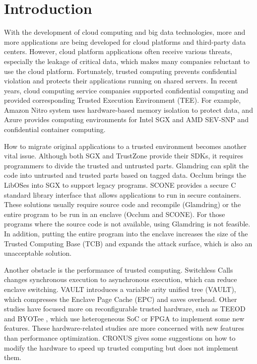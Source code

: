 \section{Introduction}
With the development of cloud computing and big data technologies,
more and more applications are being developed for cloud platforms
and third-party data centers. However, cloud platform applications
often receive various threats, especially the leakage of critical data,
which makes many companies reluctant to use the cloud platform.
Fortunately, trusted computing prevents confidential violation and
protects their applications running on shared servers.
In recent years, cloud computing service companies supported confidential
computing and provided corresponding Trusted Execution Environment (TEE).
For example, Amazon Nitro system \cite{AmazonNitro} uses hardware-based memory
isolation to protect data, and Azure \cite{AzureDocs} provides computing environments
for Intel SGX and AMD SEV-SNP and confidential container computing.

How to migrate original applications to a trusted environment becomes another
vital issue. Although both SGX and TrustZone provide their SDKs,
it requires programmers to divide the trusted and untrusted parts.
Glamdring \cite{Lind2017GlamdringAA} can split the code into untrusted and
trusted parts based on tagged data. Occlum \cite{Shen2020OcclumSA} brings
the LibOSes into SGX to support legacy programs. SCONE \cite{Arnautov2016SCONESL}
provides a secure C standard library interface that allows applications to
run in secure containers.
These solutions usually require source code and recompile (Glamdring) or
the entire program to be run in an enclave (Occlum and SCONE).
For those programs where the source code is not available,
using Glamdring is not feasible.
In addition, putting the entire program into the enclave increases
the size of the Trusted Computing Base (TCB) and expands the attack surface,
which is also an unacceptable solution.

Another obstacle is the performance of trusted computing.
Switchless Calls \cite{Tian2018SwitchlessCM} changes synchronous execution
to asynchronous execution, which can reduce enclave switching.
VAULT \cite{Taassori2018VAULTRP} introduces a variable arity unified tree (VAULT),
which compresses the Enclave Page Cache (EPC) and saves overhead.
Other studies have focused more on reconfigurable trusted hardware,
such as TEEOD \cite{Pereira2021TowardsAT} and BYOTee \cite{Armanuzzaman2022BYOTeeTB},
which use heterogeneous SoC or FPGA to implement some new features.
These hardware-related studies are more concerned with new features than
performance optimization. CRONUS \cite{Jiang2022CRONUSFS} gives some suggestions
on how to modify the hardware to speed up trusted computing but does not
implement them.


